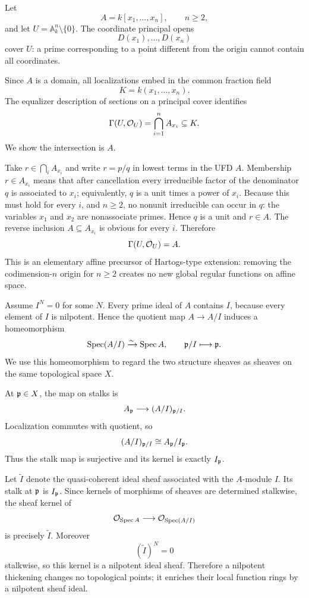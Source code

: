 \begin{solution}[Challenge VI.17.C2]
Let
\[
A=k[x_1,\dots,x_n],\qquad n\ge2,
\]
and let $U=\mathbb A_k^n\setminus\{0\}$.  The coordinate principal opens
\[
D(x_1),\dots,D(x_n)
\]
cover $U$: a prime corresponding to a point different from the origin cannot contain all coordinates.

Since $A$ is a domain, all localizations embed in the common fraction field
\[
K=k(x_1,\dots,x_n).
\]
The equalizer description of sections on a principal cover identifies
\[
\Gamma(U,\mathcal O_U)=\bigcap_{i=1}^n A_{x_i}\subseteq K.
\]
We show the intersection is $A$.

Take $r\in\bigcap_iA_{x_i}$ and write $r=p/q$ in lowest terms in the UFD $A$.  Membership $r\in A_{x_i}$ means that after cancellation every irreducible factor of the denominator $q$ is associated to $x_i$; equivalently, $q$ is a unit times a power of $x_i$.  Because this must hold for every $i$, and $n\ge2$, no nonunit irreducible can occur in $q$: the variables $x_1$ and $x_2$ are nonassociate primes.  Hence $q$ is a unit and $r\in A$.  The reverse inclusion $A\subseteq A_{x_i}$ is obvious for every $i$.  Therefore
\[
\Gamma(U,\mathcal O_U)=A.
\]
This is an elementary affine precursor of Hartogs-type extension: removing the codimension-$n$ origin for $n\ge2$ creates no new global regular functions on affine space.
\end{solution}

\begin{solution}[Challenge VI.17.C3]
Assume $I^N=0$ for some $N$.  Every prime ideal of $A$ contains $I$, because every element of $I$ is nilpotent.  Hence the quotient map $A\to A/I$ induces a homeomorphism
\[
\operatorname{Spec}(A/I)\xrightarrow{\sim}\operatorname{Spec} A,
\qquad
\mathfrak p/I\longmapsto\mathfrak p.
\]
We use this homeomorphism to regard the two structure sheaves as sheaves on the same topological space $X$.

At $\mathfrak p\in X$, the map on stalks is
\[
A_{\mathfrak p}\longrightarrow (A/I)_{\mathfrak p/I}.
\]
Localization commutes with quotient, so
\[
(A/I)_{\mathfrak p/I}\cong A_{\mathfrak p}/I_{\mathfrak p}.
\]
Thus the stalk map is surjective and its kernel is exactly $I_{\mathfrak p}$.

Let $\widetilde I$ denote the quasi-coherent ideal sheaf associated with the $A$-module $I$.  Its stalk at $\mathfrak p$ is $I_{\mathfrak p}$.  Since kernels of morphisms of sheaves are determined stalkwise, the sheaf kernel of
\[
\mathcal O_{\operatorname{Spec} A}\longrightarrow\mathcal O_{\operatorname{Spec}(A/I)}
\]
is precisely $\widetilde I$.  Moreover
\[
(\widetilde I)^N=0
\]
stalkwise, so this kernel is a nilpotent ideal sheaf.  Therefore a nilpotent thickening changes no topological points; it enriches their local function rings by a nilpotent sheaf ideal.
\end{solution}

